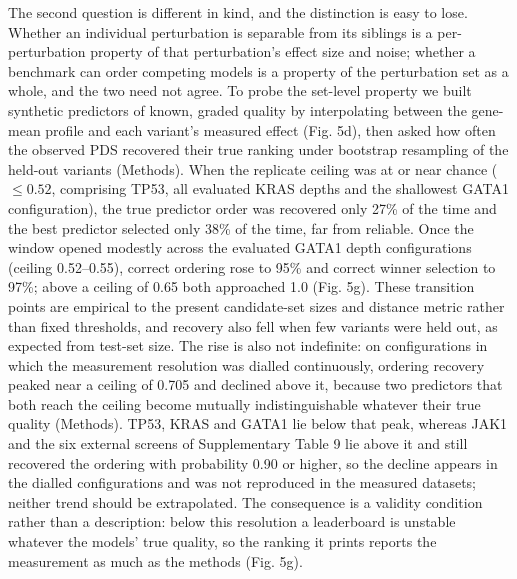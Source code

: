 \documentclass[11pt,letterpaper]{article}
\begin{document}
The second question is different in kind, and the distinction is easy to lose. Whether an individual perturbation is separable from its siblings is a per-perturbation property of that perturbation's effect size and noise; whether a benchmark can order competing models is a property of the perturbation set as a whole, and the two need not agree. To probe the set-level property we built synthetic predictors of known, graded quality by interpolating between the gene-mean profile and each variant's measured effect (Fig. 5d), then asked how often the observed PDS recovered their true ranking under bootstrap resampling of the held-out variants (Methods). When the replicate ceiling was at or near chance ($\leq 0.52$, comprising TP53, all evaluated KRAS depths and the shallowest GATA1 configuration), the true predictor order was recovered only 27\% of the time and the best predictor selected only 38\% of the time, far from reliable. Once the window opened modestly across the evaluated GATA1 depth configurations (ceiling 0.52--0.55), correct ordering rose to 95\% and correct winner selection to 97\%; above a ceiling of 0.65 both approached 1.0 (Fig. 5g). These transition points are empirical to the present candidate-set sizes and distance metric rather than fixed thresholds, and recovery also fell when few variants were held out, as expected from test-set size. The rise is also not indefinite: on configurations in which the measurement resolution was dialled continuously, ordering recovery peaked near a ceiling of 0.705 and declined above it, because two predictors that both reach the ceiling become mutually indistinguishable whatever their true quality (Methods). TP53, KRAS and GATA1 lie below that peak, whereas JAK1 and the six external screens of Supplementary Table 9 lie above it and still recovered the ordering with probability 0.90 or higher, so the decline appears in the dialled configurations and was not reproduced in the measured datasets; neither trend should be extrapolated. The consequence is a validity condition rather than a description: below this resolution a leaderboard is unstable whatever the models' true quality, so the ranking it prints reports the measurement as much as the methods (Fig. 5g).
\end{document}
